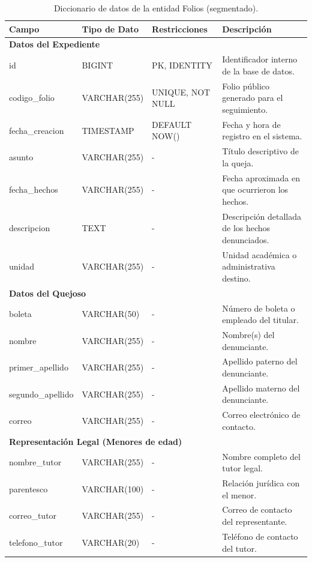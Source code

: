 \begin{table}[H]
\centering
\small
\begin{tabularx}{\textwidth}{|l|l|l|X|}
\hline
\rowcolor{azulESCOM} 
\color{white}\textbf{Campo} & \color{white}\textbf{Tipo de Dato} & \color{white}\textbf{Restricciones} & \color{white}\textbf{Descripci\'on} \\ \hline
\multicolumn{4}{|l|}{\cellcolor[HTML]{EFEFEF}\textbf{Datos del Expediente}} \\ \hline
id & BIGINT & PK, IDENTITY & Identificador interno de la base de datos. \\ \hline
codigo\_folio & VARCHAR(255) & UNIQUE, NOT NULL & Folio p\'ublico generado para el seguimiento. \\ \hline
fecha\_creacion & TIMESTAMP & DEFAULT NOW() & Fecha y hora de registro en el sistema. \\ \hline
asunto & VARCHAR(255) & - & T\'itulo descriptivo de la queja. \\ \hline
fecha\_hechos & VARCHAR(255) & - & Fecha aproximada en que ocurrieron los hechos. \\ \hline
descripcion & TEXT & - & Descripci\'on detallada de los hechos denunciados. \\ \hline
unidad & VARCHAR(255) & - & Unidad acad\'emica o administrativa destino. \\ \hline
\multicolumn{4}{|l|}{\cellcolor[HTML]{EFEFEF}\textbf{Datos del Quejoso}} \\ \hline
boleta & VARCHAR(50) & - & N\'umero de boleta o empleado del titular. \\ \hline
nombre & VARCHAR(255) & - & Nombre(s) del denunciante. \\ \hline
primer\_apellido & VARCHAR(255) & - & Apellido paterno del denunciante. \\ \hline
segundo\_apellido & VARCHAR(255) & - & Apellido materno del denunciante. \\ \hline
correo & VARCHAR(255) & - & Correo electr\'onico de contacto. \\ \hline
\multicolumn{4}{|l|}{\cellcolor[HTML]{EFEFEF}\textbf{Representaci\'on Legal (Menores de edad)}} \\ \hline
nombre\_tutor & VARCHAR(255) & - & Nombre completo del tutor legal. \\ \hline
parentesco & VARCHAR(100) & - & Relaci\'on jur\'idica con el menor. \\ \hline
correo\_tutor & VARCHAR(255) & - & Correo de contacto del representante. \\ \hline
telefono\_tutor & VARCHAR(20) & - & Tel\'efono de contacto del tutor. \\ \hline
\end{tabularx}
\caption{Diccionario de datos de la entidad Folios (segmentado).}
\label{tab:dict_folios}
\end{table}

